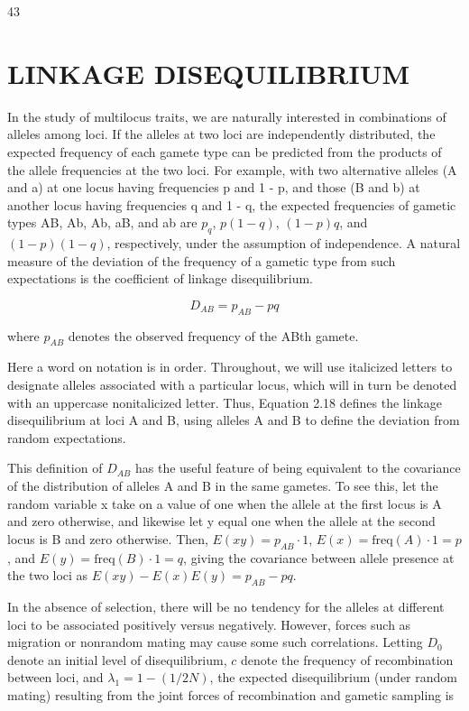 \documentclass{article}
\begin{document}
43

\section{LINKAGE DISEQUILIBRIUM}
In the study of multilocus traits, we are naturally interested in combinations of alleles among loci. If the alleles at two loci are independently distributed, the expected frequency of each gamete type can be predicted from the products of the allele frequencies at the two loci. For example, with two alternative alleles (A and a) at one locus having frequencies p and 1 - p, and those (B and b) at another locus having frequencies q and 1 - q, the expected frequencies of gametic types AB, Ab, Ab, aB, and ab are  $ p_q $,  $ p(1 - q) $,  $ (1 - p)q $, and  $ (1 - p)(1 - q) $, respectively, under the assumption of independence. A natural measure of the deviation of the frequency of a gametic type from such expectations is the coefficient of linkage disequilibrium.

\begin{equation}
D_{AB}=p_{AB}-pq
\tag{2.18}
\label{eq:2_18}
\end{equation}

where  $ p_{AB} $ denotes the observed frequency of the ABth gamete.

Here a word on notation is in order. Throughout, we will use italicized letters to designate alleles associated with a particular locus, which will in turn be denoted with an uppercase nonitalicized letter. Thus, Equation 2.18 defines the linkage disequilibrium at loci A and B, using alleles A and B to define the deviation from random expectations.

This definition of  $ D_{AB} $ has the useful feature of being equivalent to the covariance of the distribution of alleles A and B in the same gametes. To see this, let the random variable x take on a value of one when the allele at the first locus is A and zero otherwise, and likewise let y equal one when the allele at the second locus is B and zero otherwise. Then,  $ E(xy) = p_{AB} \cdot 1 $,  $ E(x) = \text{freq}(A) \cdot 1 = p $, and  $ E(y) = \text{freq}(B) \cdot 1 = q $, giving the covariance between allele presence at the two loci as  $ E(xy) - E(x)E(y) = p_{AB} - pq $.

In the absence of selection, there will be no tendency for the alleles at different loci to be associated positively versus negatively. However, forces such as migration or nonrandom mating may cause some such correlations. Letting  $ D_0 $ denote an initial level of disequilibrium,  $ c $ denote the frequency of recombination between loci, and  $ \lambda_1 = 1 - (1/2N) $, the expected disequilibrium (under random mating) resulting from the joint forces of recombination and gametic sampling is
\end{document}
